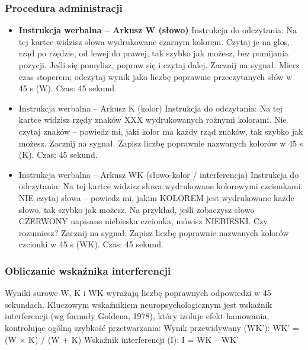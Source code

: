 \documentclass[11pt,a4paper]{article}
\begin{document}
\subsubsection{Procedura administracji}

\begin{itemize}

\item \textbf{Instrukcja werbalna – Arkusz W (słowo)}
Instrukcja do odczytania: Na tej kartce widzisz słowa wydrukowane czarnym kolorem. Czytaj je na glos, rząd po rzędzie, od lewej do prawej, tak szybko jak możesz, bez pomijania pozycji. Jeśli się pomylisz, popraw się i czytaj dalej. Zacznij na sygnał. Mierz czas stoperem; odczytaj wynik jako liczbę poprawnie przeczytanych słów w 45 s (W).
Czas: 45 sekund.
\vspace{0.6em}

\item Instrukcja werbalna – Arkusz K (kolor)
Instrukcja do odczytania: Na tej kartce widzisz rzędy znaków XXX wydrukowanych rożnymi kolorami. Nie czytaj znaków – powiedz mi, jaki kolor ma każdy rząd znaków, tak szybko jak możesz. Zacznij na sygnał. Zapisz liczbę poprawnie nazwanych kolorów w 45 s (K).
Czas: 45 sekund.
\vspace{0.6em}

\item Instrukcja werbalna – Arkusz WK (słowo-kolor / interferencja)
Instrukcja do odczytania: Na tej kartce widzisz słowa wydrukowane kolorowymi czcionkami. NIE czytaj słowa – powiedz mi, jakim KOLOREM jest wydrukowane każde słowo, tak szybko jak możesz. Na przykład, jeśli zobaczysz słowo CZERWONY napisane niebieska czcionka, mówisz NIEBIESKI. Czy rozumiesz? Zacznij na sygnał. Zapisz liczbę poprawnie nazwanych kolorów czcionki w 45 s (WK).
Czas: 45 sekund.
\end{itemize}
\vspace{0.6em}


\subsubsection{Obliczanie wskaźnika interferencji}

Wyniki surowe W, K i WK wyrażają liczbę poprawnych odpowiedzi w 45 sekundach. Kluczowym wskaźnikiem neuropsychologicznym jest wskaźnik interferencji (wg formuły Goldena, 1978), który izoluje efekt hamowania, kontrolując ogólną szybkość przetwarzania:
Wynik przewidywany (WK'): WK' = (W × K) / (W + K)
Wskaźnik interferencji (I): I = WK – WK'
\end{document}

